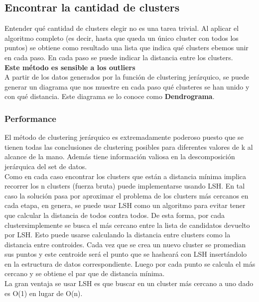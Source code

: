 \documentclass[titlepage,a4paper]{article}
\begin{document}
\subsection*{Encontrar la cantidad de clusters}
Entender qué cantidad de clusters elegir no es una tarea trivial. Al aplicar el algoritmo completo (es decir, hasta que queda un único cluster con todos los puntos) se obtiene como resultado una lista que indica qué clusters ebemos unir en cada paso. En cada paso se puede indicar la distancia entre los clusters. \\

\textbf{Este método es sensible a los outliers}\\


A partir de los datos generados por la función de clustering jerárquico, se puede generar un diagrama que nos muestre en cada paso qué clusteres se han unido y  con qué distancia. Este diagrama se lo conoce como \textbf{Dendrograma}. 

\subsubsection*{Performance}
El método de clustering jerárquico es extremadamente poderoso puesto que se tienen todas las conclusiones de clustering posibles para diferentes valores de k al alcance de la mano. Además tiene información valiosa en la descomposición jerárquica del set de datos. \\

Como en cada caso encontrar los clusters que están a distancia mínima implica recorrer los n clusters (fuerza bruta) puede implementarse usando LSH. En tal caso la solución pasa por aproximar el problema de los clusters más cercanos en cada etapa, en genera, se puede usar LSH como un algoritmo para evitar tener que calcular la distancia de todos contra todos. De esta forma, por cada clustersimplemente se busca el más cercano entre la lista de candidatos devuelto por LSH. Esto puede usarse calculando la distancia entre clusters como la distancia entre controides. Cada vez que se crea un nuevo cluster se promedian sus puntos y este centroide será el punto que se hasheará con LSH insertándolo en la estructura de datos correspondiente. Luego por cada punto se calcula el más cercano y se obtiene el par que de distancia mínima. \\

La gran ventaja se usar LSH es que buscar en un cluster más cercano a uno dado es O(1) en lugar de O(n). \\
\end{document}
